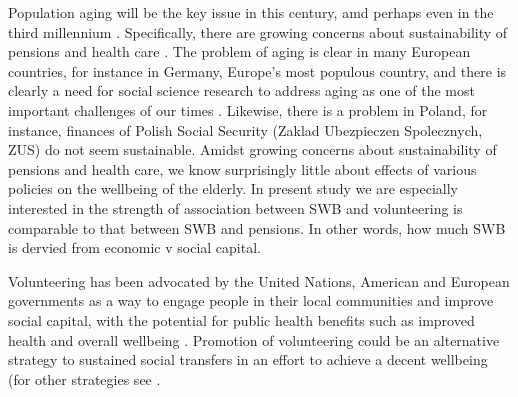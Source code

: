 \documentclass[10pt, letterpaper]{article}
\newcommand{\emd}[1]{\ExecuteMetaData[/tmp/tex]{#1}} %
\begin{document}
\begin{spacing}{1.4} %




Population aging will be the key issue in this century, amd perhaps even in 
the third
millennium  \citep{stolnitz1992demographic}. Specifically, there are growing
concerns about sustainability of pensions and health care \citep{jurges12}. 
The problem of aging is clear in many European countries, for instance in
Germany, Europe's most populous country, and there is clearly a need for social
science research to address aging as one of the most important challenges of our
times \citep{vaupel2006redistributing}. Likewise, there is a problem in
Poland, for instance, finances  of Polish Social Security (Zaklad Ubezpieczen
Spolecznych, ZUS) %
do not seem sustainable. 
%
Amidst growing concerns about sustainability of pensions and health care, we
know surprisingly little about effects of various policies on the wellbeing of
the elderly. %
 In present study %
we are especially interested in the strength of association between SWB and
volunteering is comparable to that between SWB and pensions. In other words, how
much SWB is dervied from economic v social capital. 

Volunteering has been advocated by the United Nations, American and European
governments as a way to engage people in their local communities and improve
social capital, with the potential for public health benefits such as improved 
health and overall wellbeing 
\citep{jenkinson2013volunteering}. Promotion of volunteering could be an
alternative 
strategy to sustained social transfers in an effort to achieve a decent
wellbeing (for other strategies see \citet[][sec. 2.4.5]{ferring10}. 


\end{spacing}
\end{document}
